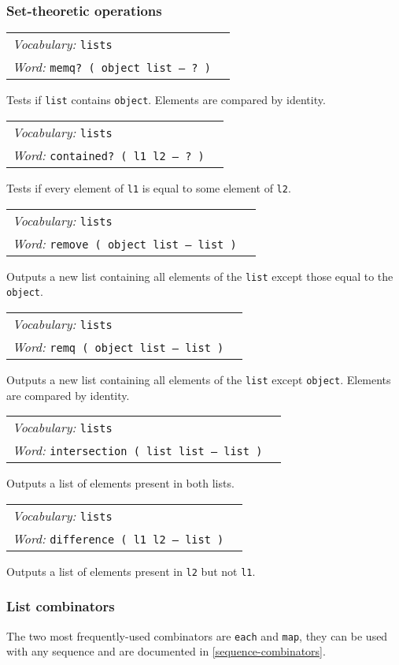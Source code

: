 \documentclass{book}
\newcommand{\vocabulary}[1]{\emph{Vocabulary:} \texttt{#1}&\\}
\newcommand{\ordinaryword}[2]{\index{\texttt{#1}}\emph{Word:} \texttt{#2}&\\}
\newcommand{\wordtable}[1]{


\begin{tabularx}{12cm}{lX}
\hline
#1
\hline
\end{tabularx}

}
\begin{document}
\subsubsection{Set-theoretic operations}

\wordtable{
\vocabulary{lists}
\ordinaryword{memq?}{memq?~( object list -- ?~)}
}
Tests if \texttt{list} contains \texttt{object}. Elements are compared by identity.
\wordtable{
\vocabulary{lists}
\ordinaryword{contained?}{contained?~( l1 l2 -- ?~)}
}
Tests if every element of \texttt{l1} is equal to some element of \texttt{l2}.
\wordtable{
\vocabulary{lists}
\ordinaryword{remove}{remove ( object list -- list )}
}
Outputs a new list containing all elements of the \texttt{list} except those equal to the \texttt{object}.
\wordtable{
\vocabulary{lists}
\ordinaryword{remq}{remq ( object list -- list )}
}
Outputs a new list containing all elements of the \texttt{list} except \texttt{object}. Elements are compared by identity.
\wordtable{
\vocabulary{lists}
\ordinaryword{intersection}{intersection ( list list -- list )}
}
Outputs a list of elements present in both lists.
\wordtable{
\vocabulary{lists}
\ordinaryword{difference}{difference ( l1 l2 -- list )}
}
Outputs a list of elements present in \texttt{l2} but not \texttt{l1}.

\subsubsection{List combinators}

The two most frequently-used combinators are \verb|each| and \verb|map|, they can be used with any sequence and are documented in \ref{sequence-combinators}.
\end{document}
